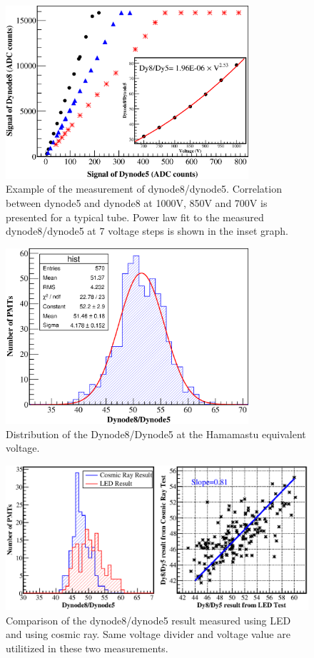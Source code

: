 \documentclass[5p, times]{elsarticle}
\begin{document}
\begin{figure}
 \centering
 \includegraphics[width=90mm]{dy58_example}
\caption{Example of the measurement of dynode8/dynode5.
Correlation between dynode5 and dynode8 at 1000V, 850V and 700V is presented for a typical tube.
Power law fit to the measured dynode8/dynode5 at 7 voltage steps is shown in the inset graph.
}
\label{fig:dy58_example}
\end{figure} 

\begin{figure}
 \centering
 \includegraphics[width=90mm]{dy58_dist}
\caption{Distribution of the Dynode8/Dynode5 at the Hamamastu equivalent voltage.}
\label{fig:dy58_dist}
\end{figure} 

\begin{figure}
 \centering
 \includegraphics[width=140mm]{dy58_ledvscm}
\caption{Comparison of the dynode8/dynode5 result measured using LED and using cosmic ray.
Same voltage divider and voltage value are utilitized in these two measurements.}
\label{fig:dy58_ledvscm}
\end{figure} 
\end{document}

